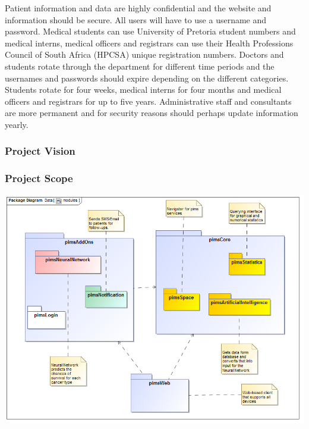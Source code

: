 Patient  information  and  data  are  highly  confidential  and  the  website  and 
information  should  be  secure.  All  users  will  have  to  use  a  username  and 
password. Medical students can use University of Pretoria student numbers and 
medical interns, medical officers and registrars can use their Health Professions 
Council  of  South  Africa  (HPCSA)  unique  registration  numbers.  Doctors  and 
students  rotate  through  the  department  for  different  time  periods  and  the 
usernames and passwords should expire depending on the different categories. 
Students  rotate  for  four  weeks,  medical  interns  for  four  months  and medical 
officers and registrars  for  up  to  five  years.  Administrative  staff  and  consultants 
are more permanent and for security reasons should perhaps update information 
yearly. \par

\subsubsection{Project Vision}
\subsubsection{Project Scope}
\includegraphics[width=\linewidth]{./Graphics/globalImages/modules}